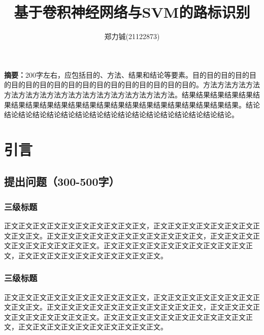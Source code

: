\documentclass{article}
\title{\textbf{基于卷积神经网络与SVM的路标识别}}
\author{
郑力铖(21122873)
}
\begin{document}
 \songti


\date{}
\maketitle


\begin{center}
\setlength{\textwidth}{15cm}
\parbox{\textwidth}{
\textbf{摘要：}200字左右，应包括目的、方法、结果和结论等要素。目的目的目的目的目的目的目的目的目的目的目的目的目的目的目的目的目的目的。方法方法方法方法方法方法方法方法方法方法方法方法方法方法方法方法。结果结果结果结果结果结果结果结果结果结果结果结果结果结果结果结果结果结果结果结果结果结果。结论结论结论结论结论结论结论结论结论结论结论结论结论结论结论结论结论。
  }
\end{center}

\section{引言}
\subsection{提出问题（300-500字）}
\subsubsection{三级标题}
正文正文正文正文正文正文正文正文正文正文，正文正文正文正文正文正文正文正文正文正文。正文正文正文正文正文正文正文正文正文正文正文，正文正文正文正文正文正文正文正文正文正文。正文正文正文正文正文正文正文正文正文正文正文，正文正文正文正文正文正文正文正文正文正文。

\subsubsection{三级标题}
正文正文正文正文正文正文正文正文正文正文，正文正文正文正文正文正文正文正文正文正文。正文正文正文正文正文正文正文正文正文正文正文，正文正文正文正文正文正文正文正文正文正文。正文正文正文正文正文正文正文正文正文正文正文，正文正文正文正文正文正文正文正文正文正文。
\end{document}
